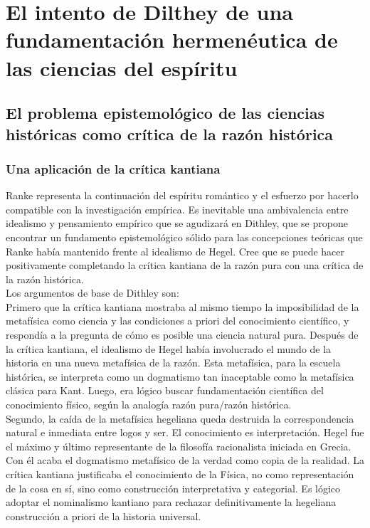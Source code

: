 \documentclass[a4paper, 11pt, twocolumn, spanish]{article}
\begin{document}
\section{El intento de Dilthey de una fundamentación hermenéutica de las ciencias del espíritu}
\label{sec:org925bd22}

\subsection{El problema epistemológico de las ciencias históricas como crítica de la razón histórica}
\label{sec:org3457179}

\subsubsection{Una aplicación de la crítica kantiana}
\label{sec:orgfd6590c}
Ranke representa la continuación del espíritu romántico y el esfuerzo
por hacerlo compatible con la investigación empírica. Es inevitable
una ambivalencia entre idealismo y pensamiento empírico que se
agudizará en Dithley, que se propone encontrar un fundamento
epistemológico sólido para las concepciones teóricas que Ranke había
mantenido frente al idealismo de Hegel. Cree que se puede hacer
positivamente completando la crítica kantiana de la razón pura con una
crítica de la razón histórica.\\[0pt]
Los argumentos de base de Dithley son:\\[0pt]
Primero que la crítica kantiana mostraba al mismo tiempo la
imposibilidad de la metafísica como ciencia y las condiciones a priori
del conocimiento científico, y respondía a la pregunta de cómo es
posible una ciencia natural pura. Después de la crítica kantiana, el
idealismo de Hegel había involucrado el mundo de la historia en una
nueva metafísica de la razón. Esta metafísica, para la escuela
histórica, se interpreta como un dogmatismo tan inaceptable como la
metafísica clásica para Kant. Luego, era lógico buscar fundamentación
científica del conocimiento físico, según la analogía razón pura/razón
histórica.\\[0pt]
Segundo, la caída de la metafísica hegeliana queda destruida la
correspondencia natural e inmediata entre logos y ser. El conocimiento
es interpretación. Hegel fue el máximo y último representante de la
filosofía racionalista iniciada en Grecia. Con él acaba el dogmatismo
metafísico de la verdad como copia de la realidad. La crítica kantiana
justificaba el conocimiento de la Física, no como representación de la
cosa en sí, sino como construcción interpretativa y categorial. Es
lógico adoptar el nominalismo kantiano para rechazar definitivamente
la hegeliana construcción a priori de la historia universal.
\end{document}
